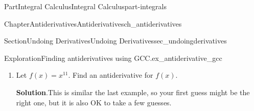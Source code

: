 \documentclass[oneside,10pt,]{tufte-book}
\newcommand{\blocktitlefont}{\relax}
\numberwithin{equation}{chapter}
\newcommand{\red}[1]{   {\color{red}   #1}   }
\newcommand{\ddx}[1]{ \dfrac{d}{dx} \Big[ #1 \Big]  }
\newcommand{\amp}{&}
\begin{document}
\begin{partptx}{Part}{Integral Calculus}{}{Integral Calculus}{}{}{part-integrals}
\begin{chapterptx}{Chapter}{Antiderivatives}{}{Antiderivatives}{}{}{ch_antiderivatives}
\begin{sectionptx}{Section}{Undoing Derivatives}{}{Undoing Derivatives}{}{}{sec_undoingderivatives}
\begin{exploration}{Exploration}{Finding antiderivatives using GCC.}{ex_antiderivative_gcc}
\begin{enumerate}[font=\bfseries,label=(\alph*),ref=\alph*]
\begin{descriptionlist}
\begin{dlimedium}{Guess 1}{ex_antiderivative_gcc-2-2-1-2-1}%
\emph{Guess:} The derivative of any power function is a power function.  So our first guess might as well be something like%
\begin{equation*}
F=x^5\text{.}
\end{equation*}
%
\par
\emph{Check:}%
\begin{equation*}
F'(x) = \ddx{x^5} = 5x^4 \red{\ \neq\  x^5}
\end{equation*}
Taking the derivative reduces the power by one, so if we want to end up with \(x^5\), we must start out with a \(x^6\) term.%
\end{dlimedium}%
\begin{dlimedium}{Guess 2:}{ex_antiderivative_gcc-2-2-1-2-2}%
\emph{Guess:} Now let's try guessing \(F(x)=x^6\)%
\par
\emph{Check:}%
\begin{equation*}
F'(x) = \ddx{x^6} = 6x^5 \red{\ \neq\  x^5}
\end{equation*}
We now have the correct power, but the wrong coefficient. To fix our guess, we should start out with a coefficient that will \emph{cancel out} the coefficient of \(6\).%
\end{dlimedium}%
\begin{dlimedium}{Guess 3:}{ex_antiderivative_gcc-2-2-1-2-3}%
\emph{Guess:} \(F(x) = \frac{1}{6}x^6\)%
\par
\emph{Check:}%
\begin{align*}
F'(x) \amp =\ddx{ \frac{1}{6}x^6 } \\
\amp =\frac{1}{6} \ddx{x^6}\\
\amp = \frac{1}{6} 6 x^5\\
\amp = x^5 
\end{align*}
That is the function we wanted \emph{after} the derivative.  Therefore \(F(x) = \frac{1}{6}x^6\) is the \emph{ante} derivative.%
\end{dlimedium}%
\end{descriptionlist}
%
\par
Therefore \(\frac{1}{6}x^{6}\) is an antiderivative of \(x^{5}\)%
\item{}Let \(f(x) = x^{11}\).  Find an antiderivative for \(f(x)\).%
\par\smallskip%
\noindent\textbf{\blocktitlefont Solution}.\hypertarget{ex_antiderivative_gcc-3-2}{}\quad{}This is similar the last example, so your first guess might be the right one, but it is also OK to take a few guesses.%

\end{enumerate}
\end{exploration}
\end{sectionptx}
\end{chapterptx}
\end{partptx}
\end{document}
